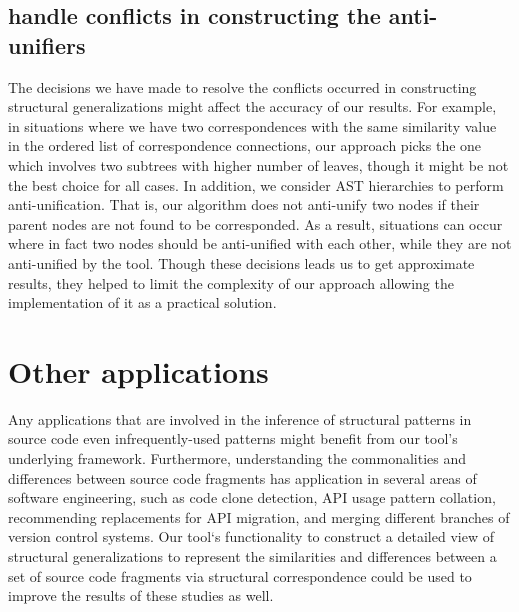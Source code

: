 \subsection{handle conflicts in constructing the anti-unifiers}  \label{conflicts} 
The decisions we have made to resolve the conflicts occurred in constructing structural generalizations might affect the accuracy of our results.
For example, in situations where we have two correspondences with the same similarity value in the ordered list of correspondence connections, our approach picks the one which involves two subtrees with higher number of leaves, though it might be not the best choice for all cases. 
In addition, we consider AST hierarchies to perform anti-unification. That is, our algorithm does not anti-unify two nodes if their parent nodes are not found to be corresponded. As a result, situations can occur where in fact two nodes should be anti-unified with each other, while they are not anti-unified by the tool. Though these decisions leads us to get approximate results, they helped to limit the complexity of our approach allowing the implementation of it as a practical solution.



\section{Other applications}  \label{other_applications}
Any applications that are involved in the inference of structural patterns in source code even infrequently-used patterns might benefit from our tool’s underlying framework.
Furthermore, understanding the commonalities and differences between source code fragments has application in several areas of software engineering, such as code clone detection, API usage pattern collation, recommending replacements for API migration, and merging different branches of version control systems. Our tool`s functionality to construct a detailed view of structural generalizations to represent the similarities and differences between a set of source code fragments via structural correspondence could be used to improve the results of these studies as well.
